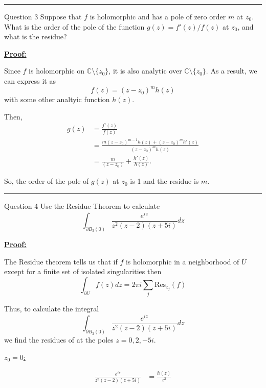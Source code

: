 \documentclass{article}
\newcommand{\C}{\mathbb{C}}
\begin{document}
\vskip 0.5cm
\hrule 
\vskip 0.5cm


\begin{mathdefinitionbox}{Question 3}
\vskip 0.5cm
Suppose that $f$ is holomorphic and has a pole of zero order $m$ at $z_0$. What is the order of the pole of the function $g(z) = f'(z) / f(z)$ at $z_0$, and what is the residue? 
\end{mathdefinitionbox}

\vskip 0.5cm
\underline{\textbf{Proof:}}

Since $f$ is holomorphic on $\C \setminus \{z_0\}$, it is also analytic over $\C \setminus \{z_0\}$. As a result, we can express it as 
\[ f(z) = (z-z_0)^m h(z) \] with some other analtyic function $h(z)$.

Then, 
\begin{align*}
  g(z) &= \frac{f'(z)}{f(z)} \\
  &= \frac{m\left(z - z_0\right)^{m-1}h(z) + (z-z_0)^m h'(z)}{(z-z_0)^m h(z)} \\
  &= \frac{m}{(z-z_0)} + \frac{h'(z)}{h(z)}.
\end{align*}

So, the order of the pole of $g(z)$ at $z_0$ is 1 and the residue is $m$.


\vskip 0.5cm
\hrule 
\vskip 0.5cm



\begin{mathdefinitionbox}{Question 4}
\vskip 0.5cm
Use the Residue Theorem to calculate 
\[  \int_{\partial B_3(0)} \frac{e^{iz}}{z^2 (z-2)(z+5i)} dz  \]
\end{mathdefinitionbox}

\vskip 0.5cm
\underline{\textbf{Proof:}}

The Residue theorem tells us that if $f$ is holomorphic in a neighborhood of $\overline{U}$ except for a finite set of isolated singularities then
\[  \int_{\partial U} f(z) dz = 2\pi i \sum_{j} \mathrm{Res}_{{z_j}} (f)  \]

\vskip 0.5cm Thus, to calculate the integral \[  \int_{\partial B_3(0)} \frac{e^{iz}}{z^2 (z-2)(z+5i)} dz  \] we find the residues of at the poles $z = 0, 2, -5i$. 

\vskip 0.5cm \underline{$z_0 = 0$:} 

\begin{align*}
  \frac{e^{iz}}{z^2 (z-2)(z+5i)} &= \frac{h(z)}{z^2}
\end{align*}
\end{document}

